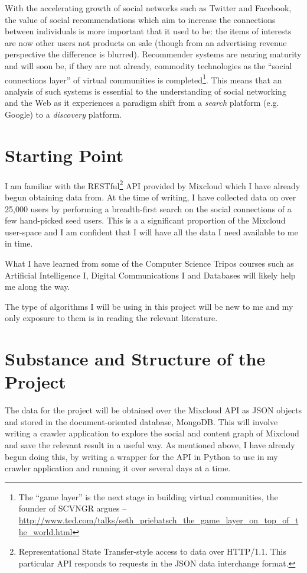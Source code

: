 With the accelerating growth of social networks such as Twitter and Facebook, the value of social recommendations which aim to increase the connections between individuals is more important that it used to be: the items of interests are now other users not products on sale (though from an advertising revenue perspective the difference is blurred). Recommender systems are nearing maturity and will soon be, if they are not already, commodity technologies as the ``social connections layer'' of virtual communities is completed\footnote{The ``game layer'' is the next stage in building virtual communities, the founder of SCVNGR argues -- \url{http://www.ted.com/talks/seth_priebatsch_the_game_layer_on_top_of_the_world.html}}. This means that an analysis of such systems is essential to the understanding of social networking and the Web as it experiences a paradigm shift from a \emph{search} platform (e.g. Google) to a \emph{discovery} platform.

\section{Starting Point}

I am familiar with the RESTful\footnote{Representational State Transfer-style access to data over HTTP/1.1. This particular API responds to requests in the JSON data interchange format.} API provided by Mixcloud which I have already begun obtaining data from. At the time of writing, I have collected data on over 25,000 users by performing a breadth-first search on the social connections of a few hand-picked seed users. This is a a significant proportion of the Mixcloud user-space and I am confident that I will have all the data I need available to me in time.

What I have learned from some of the Computer Science Tripos courses such as Artificial Intelligence I, Digital Communications I and Databases will likely help me along the way.

The type of algorithms I will be using in this project will be new to me and my only exposure to them is in reading the relevant literature.
  
\section{Substance and Structure of the Project}

The data for the project will be obtained over the Mixcloud API as JSON objects and stored in the document-oriented database, MongoDB. This will involve writing a crawler application to explore the social and content graph of Mixcloud and save the relevant result in a useful way. As mentioned above, I have already begun doing this, by writing a wrapper for the API in Python to use in my crawler application and running it over several days at a time.

